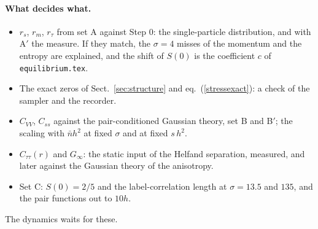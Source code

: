 \documentclass[11pt,aps,preprint,nofootinbib,superscriptaddress,tightenlines]{revtex4-2}
\def\Eq#1{eq.~(\ref{#1})}
\def\Sect#1{Sect.~\ref{#1}}
\let\oldparagraph\paragraph
\renewcommand{\paragraph}{\par\bigskip\oldparagraph}
\begin{document}
\paragraph{What decides what.}
\begin{itemize}
\item $r_s$, $r_m$, $r_\tau$ from set A against Step 0: the single-particle distribution, and with A$'$ the measure.  If they match, the $\sigma=4$ misses
  of the momentum and the entropy are explained, and the shift of $S(0)$ is the coefficient $c$ of \texttt{equilibrium.tex}.
\item The exact zeros of \Sect{sec:structure} and \Eq{stressexact}: a check of the sampler and the recorder.
\item $C_{VV}$, $C_{ss}$ against the pair-conditioned Gaussian theory, set B and B$'$; the scaling with $\bar nh^2$ at fixed $\sigma$ and at fixed $s\,h^2$.
\item $C_{\tau\tau}(r)$ and $G_\infty$: the static input of the Helfand separation, measured, and later against the Gaussian theory of the anisotropy.
\item Set C: $S(0)=2/5$ and the label-correlation length at $\sigma=13.5$ and $135$, and the pair functions out to $10h$.
\end{itemize}
The dynamics waits for these.
\end{document}
